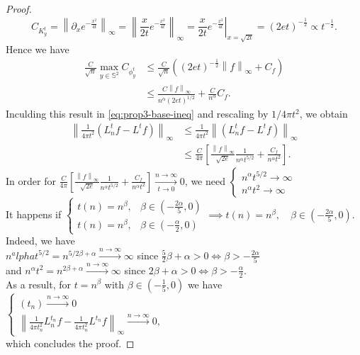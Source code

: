 \documentclass{article} %
\newcommand{\norm}[1]{\left\lVert#1\right\rVert}
\renewcommand{\S}{\mathbb{S}}
\newcommand{\linefrac}[2]{
    {#1/#2}
}
\begin{document}
\begin{proof}
\begin{equation*}
C_{K^t_y} = \norm{\partial_x e^{-\frac{x^2}{4t}}}_\infty = \norm{\frac{x}{2t}e^{-\frac{x^2}{4t}}}_\infty = \left. \frac{x}{2t}e^{-\frac{x^2}{4t}}\right|_{x=\sqrt{2t}}=(2et)^{-\frac{1}{2}}\propto t ^ {-\frac{1}{2}}.
\end{equation*}
Hence we have
\begin{align*}
	\frac{C}{\sqrt{n}}  \max _{y\in \S^2} C_{\phi^t_y}
	&\leq  \frac{C}{\sqrt{n}} \left( (2et)^{-\frac{1}{2}} \norm{f}_\infty + C_f \right)\\
	&\leq \frac{C \norm{f}_\infty}{n^\alpha(2et)^{1/2}} +   \frac{C}{n^\alpha} C_f.
\end{align*}
Inculding this result in \eqref{eq:prop3-base-ineq} and rescaling by $\linefrac{1}{4\pi t^2}$, we obtain
\begin{align*}
	\norm{\frac{1}{4\pi t^2}\left(L_n^tf-L^tf\right)}_\infty&\leq \frac{1}{4\pi t^2}\norm{\left(L_n^tf-L^tf\right)}_\infty \\
	&\leq \frac{C}{4\pi}\left[\frac{\norm{f}_\infty}{\sqrt{2e}}\frac{1}{n^\alpha t^{5/2}} + \frac{C_f}{n^\alpha t^2}\right].
\end{align*}
In order for $ \frac{C}{4\pi}\left[\frac{\norm{f}_\infty}{\sqrt{2e}}\frac{1}{n^\alpha t^{5/2}} + \frac{C_f}{n^\alpha t^2}\right] \xrightarrow[t\to 0 ]{n\to\infty}0$,
we need $\begin{cases}
n^\alpha t^{5/2} \rightarrow \infty\\
n^\alpha t^2 \rightarrow \infty
\end{cases}$ \\
It happens if $\begin{cases}
t(n) = n^\beta, &\beta\in(-\frac{2\alpha}{5}, 0) \\
t(n) = n^\beta, &\beta\in(-\frac{\alpha}{2}, 0)
\end{cases} \implies t(n) = n^\beta, \quad \beta\in(-\frac{2\alpha}{5}, 0)$.\\
Indeed, we have\\
$n^alpha t^{5/2}=n^{5/2\beta+\alpha}\xrightarrow{n \to \infty} \infty$ since $\frac{5}{2}\beta+\alpha>0 \iff \beta>-\frac{2\alpha}{5}$\\
and $n^\alpha t^2=n^{2\beta+\alpha}\xrightarrow {n \to \infty} \infty$ since $2\beta+\alpha>0 \iff \beta>-\frac{\alpha}{2}$.\\
As a result, for $t=n^\beta$ with $\beta\in(-\frac{1}{5}, 0)$ we have
$\begin{cases}
(t_n)\xrightarrow{n\to\infty}0\\
\norm{\frac{1}{4\pi t_n^2}L_n^{t_n}f-\frac{1}{4\pi t_n^2}L^{t_n}f}_\infty  \xrightarrow{n\to\infty}0,
\end{cases}$\\
which concludes the proof.
\end{proof}
\end{document}
